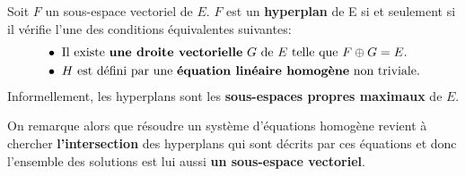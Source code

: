 \subsection*{}
Soit \(F\) un sous-espace vectoriel de \(E\).\+
\(F\) est un \textbf{hyperplan} de E si et seulement si il vérifie l'une des conditions équivalentes suivantes:
\begin{align*}
    &\bullet \text{ Il existe \textbf{une droite vectorielle} \(G\) de \(E\) telle que \(F \oplus G = E\).} \\
    &\bullet \text{ \(H\) est défini par une \textbf{équation linéaire homogène} non triviale.}
\end{align*}
Informellement, les hyperplans sont les \textbf{sous-espaces propres maximaux} de \(E\). \<

On remarque alors que résoudre un système d'équations homogène revient à chercher \textbf{l'intersection} des hyperplans qui sont décrits par ces équations et donc l'ensemble des solutions est lui aussi \textbf{un sous-espace vectoriel}.\<